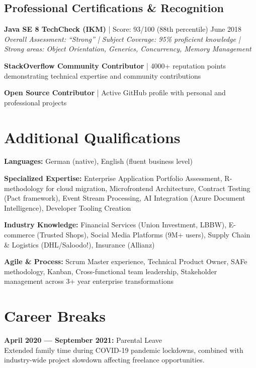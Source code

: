 \documentclass[10pt,a4paper]{article}
\begin{document}
\vspace{6pt}

\subsection{Professional Certifications \& Recognition}

\textbf{Java SE 8 TechCheck (IKM)} | Score: 93/100 (88th percentile) \hfill June 2018 \\
\textit{Overall Assessment: ``Strong'' | Subject Coverage: 95\% proficient knowledge | Strong areas: Object Orientation, Generics, Concurrency, Memory Management}

\textbf{StackOverflow Community Contributor} | 4000+ reputation points demonstrating technical expertise and community contributions

\textbf{Open Source Contributor} | Active GitHub profile with personal and professional projects

\vspace{6pt}

\section{Additional Qualifications}

\textbf{Languages:} German (native), English (fluent business level)

\textbf{Specialized Expertise:} Enterprise Application Portfolio Assessment, R-methodology for cloud migration, Microfrontend Architecture, Contract Testing (Pact framework), Event Stream Processing, AI Integration (Azure Document Intelligence), Developer Tooling Creation

\textbf{Industry Knowledge:} Financial Services (Union Investment, LBBW), E-commerce (Trusted Shops), Social Media Platforms (9M+ users), Supply Chain \& Logistics (DHL/Saloodo!), Insurance (Allianz)

\textbf{Agile \& Process:} Scrum Master experience, Technical Product Owner, SAFe methodology, Kanban, Cross-functional team leadership, Stakeholder management across 3+ year enterprise transformations

\vspace{6pt}

\section{Career Breaks}

\textbf{April 2020 --- September 2021:} Parental Leave \\
Extended family time during COVID-19 pandemic lockdowns, combined with industry-wide project slowdown affecting freelance opportunities.
\end{document}
